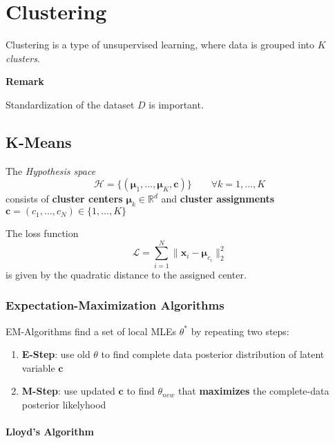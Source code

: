 \section{Clustering}
Clustering is a type of unsupervised learning, where data is grouped into $K$ \textit{clusters}.

\textbf{Remark}

Standardization of the dataset $D$ is important.

\subsection{K-Means}
The \textit{Hypothesis space}
\noindent\begin{equation*}
    \mathcal{H} = \{(\boldsymbol{\mu}_1,\ldots,\boldsymbol{\mu}_K,\mathbf{c})\}\qquad \forall k=1,\ldots, K
\end{equation*}
consists of \textbf{cluster centers} $\boldsymbol{\mu}_k\in \mathbb{R}^d$ and \textbf{cluster assignments} $\mathbf{c} = (c_1,\ldots,c_N)\in\{1,\ldots, K\}$

\newpar{}
The loss function
\noindent\begin{equation*}
    \mathcal{L}=\sum_{i=1}^{N} \|\mathbf{x}_i-\boldsymbol{\mu}_{c_i} \|_2^2
\end{equation*}
is given by the quadratic distance to the assigned center.

\subsubsection{Expectation-Maximization Algorithms}
EM-Algorithms find a set of local MLEs $\theta^*$ by repeating two steps:
\begin{enumerate}
    \item \textbf{E-Step}: use old $\theta$ to find complete data posterior distribution of latent variable $\mathbf{c}$
    \item \textbf{M-Step}: use updated $\mathbf{c}$ to find $\theta_{new}$ that \textbf{maximizes} the complete-data posterior likelyhood
\end{enumerate}

\paragraph{Lloyd's Algorithm}

